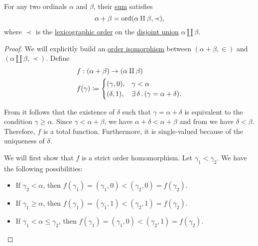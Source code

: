 \begin{proposition}\label{thm:ordinal_addition_disjoin_union}
  For any two ordinals \( \alpha \) and \( \beta \), their \hyperref[def:ordinal_arithmetic/addition]{sum} satisfies
  \begin{equation*}
    \alpha + \beta = \operatorname{ord}(\alpha \amalg \beta, \prec),
  \end{equation*}
  where \( \prec \) is the \hyperref[def:lexicographic_order]{lexicographic order} on the \hyperref[def:disjoint_union]{disjoint union} \( \alpha \amalg \beta \).
\end{proposition}
\begin{proof}
  We will explicitly build an \hyperref[def:partially_ordered_set/homomorphism]{order isomorphism} between \( (\alpha + \beta, \in) \) and \( (\alpha \amalg \beta, \prec) \). Define
  \begin{equation*}
    \begin{aligned}
      &f: (\alpha + \beta) \to (\alpha \amalg \beta) \\
      &f(\gamma) \coloneqq \begin{cases}
        (\gamma, 0), &\gamma < \alpha \\
        (\delta, 1), &\exists \thinspace \delta \thinspace . \thinspace (\gamma = \alpha + \delta).
      \end{cases}
    \end{aligned}
  \end{equation*}

  From  it follows that the existence of \( \delta \) such that \( \gamma = \alpha + \delta \) is equivalent to the condition \( \gamma \geq \alpha \). Since \( \gamma < \alpha + \beta \), we have \( \alpha + \delta < \alpha + \beta \) and from  we have \( \delta < \beta \). Therefore, \( f \) is a total function. Furthermore, it is single-valued because of the uniqueness of \( \delta \).

  We will first show that \( f \) is a strict order homomorphism. Let \( \gamma_1 < \gamma_2 \). We have the following possibilities:
  \begin{itemize}
    \item If \( \gamma_2 < \alpha \), then \( f(\gamma_1) = (\gamma_1, 0) < (\gamma_2, 0) = f(\gamma_2) \).
    \item If \( \gamma_1 \geq \alpha \), then \( f(\gamma_1) = (\gamma_1, 1) < (\gamma_2, 1) = f(\gamma_2) \).
    \item If \( \gamma_1 < \alpha \leq \gamma_2 \), then \( f(\gamma_1) = (\gamma_1, 0) < (\gamma_2, 1) = f(\gamma_2) \).
  \end{itemize}


\end{proof}
